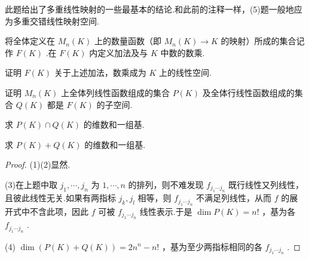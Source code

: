 \begin{note}
	此题给出了多重线性映射的一些最基本的结论.和此前的注释一样，(5)题一般地应为多重交错线性映射空间.
\end{note}
\begin{prob}[30]
	将全体定义在 $M_n(K)$ 上的数量函数（即 $M_n(K)\to K$ 的映射）所成的集合记作 $F(K)$ .在 $F(K)$ 内定义加法及与 $K$ 中数的数乘.
	\begin{mylist}
		\item 证明 $F(K)$ 关于上述加法，数乘成为 $K$ 上的线性空间.
		\item 证明 $M_n(K)$ 上全体列线性函数组成的集合 $P(K)$ 及全体行线性函数组成的集合 $Q(K)$ 都是 $F(K)$ 的子空间.
		\item 求 $P(K)\cap Q(K)$ 的维数和一组基.
		\item 求 $P(K)+Q(K)$ 的维数和一组基.
	\end{mylist}
\end{prob}
\begin{proof}
	(1)(2)显然.

	(3)在上题中取 $j_1,\cdots,j_n$ 为 $1,\cdots,n$ 的排列，则不难发现 $f_{j_1\cdots j_n}$ 既行线性又列线性，且彼此线性无关.如果有两指标 $j_k,j_l$ 相等，则 $f_{j_1\cdots j_n}$ 不满足列线性，从而 $f$ 的展开式中不含此项，因此 $f$ 可被 $f_{j_1\cdots j_n}$ 线性表示.于是 $\dim P(K)=n!$ ，基为各 $f_{j_1\cdots j_n}$ .

	(4) $\dim(P(K)+Q(K))=2n^n-n!$ ，基为至少两指标相同的各 $f_{j_1\cdots j_n}$ .
\end{proof}
